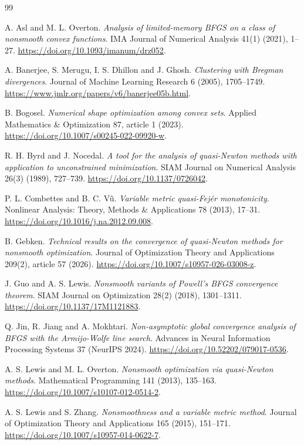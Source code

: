 \begin{thebibliography}{99}

 A. Asl and M. L. Overton. \emph{Analysis of limited-memory BFGS on a class of nonsmooth convex functions}. IMA Journal of Numerical Analysis 41(1) (2021), 1--27. \url{https://doi.org/10.1093/imanum/drz052}.

 A. Banerjee, S. Merugu, I. S. Dhillon and J. Ghosh. \emph{Clustering with Bregman divergences}. Journal of Machine Learning Research 6 (2005), 1705--1749. \url{https://www.jmlr.org/papers/v6/banerjee05b.html}.

 B. Bogosel. \emph{Numerical shape optimization among convex sets}. Applied Mathematics \& Optimization 87, article 1 (2023). \url{https://doi.org/10.1007/s00245-022-09920-w}.

 R. H. Byrd and J. Nocedal. \emph{A tool for the analysis of quasi-Newton methods with application to unconstrained minimization}. SIAM Journal on Numerical Analysis 26(3) (1989), 727--739. \url{https://doi.org/10.1137/0726042}.

 P. L. Combettes and B. C. V\~u. \emph{Variable metric quasi-Fej\'er monotonicity}. Nonlinear Analysis: Theory, Methods \& Applications 78 (2013), 17--31. \url{https://doi.org/10.1016/j.na.2012.09.008}.

 B. Gebken. \emph{Technical results on the convergence of quasi-Newton methods for nonsmooth optimization}. Journal of Optimization Theory and Applications 209(2), article 57 (2026). \url{https://doi.org/10.1007/s10957-026-03008-z}.

 J. Guo and A. S. Lewis. \emph{Nonsmooth variants of Powell's BFGS convergence theorem}. SIAM Journal on Optimization 28(2) (2018), 1301--1311. \url{https://doi.org/10.1137/17M1121883}.

 Q. Jin, R. Jiang and A. Mokhtari. \emph{Non-asymptotic global convergence analysis of BFGS with the Armijo-Wolfe line search}. Advances in Neural Information Processing Systems 37 (NeurIPS 2024). \url{https://doi.org/10.52202/079017-0536}.

 A. S. Lewis and M. L. Overton. \emph{Nonsmooth optimization via quasi-Newton methods}. Mathematical Programming 141 (2013), 135--163. \url{https://doi.org/10.1007/s10107-012-0514-2}.

 A. S. Lewis and S. Zhang. \emph{Nonsmoothness and a variable metric method}. Journal of Optimization Theory and Applications 165 (2015), 151--171. \url{https://doi.org/10.1007/s10957-014-0622-7}.


\end{thebibliography}
